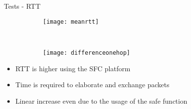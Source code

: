 \begin{frame}{Tests - RTT}

  \vspace{-1cm}

  \begin{figure}[H]
    \begin{subfigure}[b]{0.45\textwidth}
      \texttt{[image: meanrtt]}
    \end{subfigure}
    ~
    \begin{subfigure}[b]{0.45\textwidth}
        \texttt{[image: differenceonehop]}
    \end{subfigure}
  \end{figure}

  \begin{itemize}
  \item RTT is higher using the SFC platform
  \item Time is required to elaborate and exchange packets
  \item Linear increase even due to the usage of the safe function
  \end{itemize}

\end{frame}